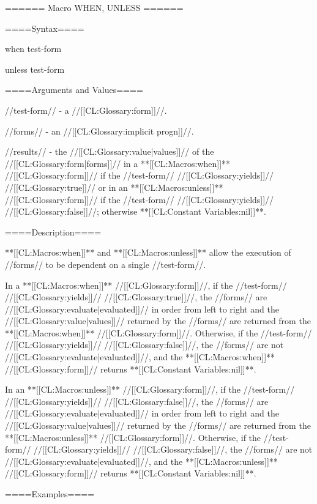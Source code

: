 ====== Macro WHEN, UNLESS ======

====Syntax====

\DefmacWithValues when {test-form } {}

\DefmacWithValues unless {test-form } {}

====Arguments and Values====

//test-form// - a //[[CL:Glossary:form]]//.

//forms// - an //[[CL:Glossary:implicit progn]]//.

//results// - the //[[CL:Glossary:value|values]]// of the //[[CL:Glossary:form|forms]]// in a **[[CL:Macros:when]]** //[[CL:Glossary:form]]// if the //test-form// //[[CL:Glossary:yields]]// //[[CL:Glossary:true]]// or in an **[[CL:Macros:unless]]** //[[CL:Glossary:form]]// if the //test-form// //[[CL:Glossary:yields]]// //[[CL:Glossary:false]]//; otherwise **[[CL:Constant Variables:nil]]**.

====Description====

**[[CL:Macros:when]]** and **[[CL:Macros:unless]]** allow the execution of //forms// to be dependent on a single //test-form//.

In a **[[CL:Macros:when]]** //[[CL:Glossary:form]]//, if the //test-form// //[[CL:Glossary:yields]]// //[[CL:Glossary:true]]//, the //forms// are //[[CL:Glossary:evaluate|evaluated]]// in order from left to right and the //[[CL:Glossary:value|values]]// returned by the //forms// are returned from the **[[CL:Macros:when]]** //[[CL:Glossary:form]]//. Otherwise, if the //test-form// //[[CL:Glossary:yields]]// //[[CL:Glossary:false]]//, the //forms// are not //[[CL:Glossary:evaluate|evaluated]]//, and the **[[CL:Macros:when]]** //[[CL:Glossary:form]]// returns **[[CL:Constant Variables:nil]]**.

In an **[[CL:Macros:unless]]** //[[CL:Glossary:form]]//, if the //test-form// //[[CL:Glossary:yields]]// //[[CL:Glossary:false]]//, the //forms// are //[[CL:Glossary:evaluate|evaluated]]// in order from left to right and the //[[CL:Glossary:value|values]]// returned by the //forms// are returned from the **[[CL:Macros:unless]]** //[[CL:Glossary:form]]//. Otherwise, if the //test-form// //[[CL:Glossary:yields]]// //[[CL:Glossary:false]]//, the //forms// are not //[[CL:Glossary:evaluate|evaluated]]//, and the **[[CL:Macros:unless]]** //[[CL:Glossary:form]]// returns **[[CL:Constant Variables:nil]]**.

====Examples====

